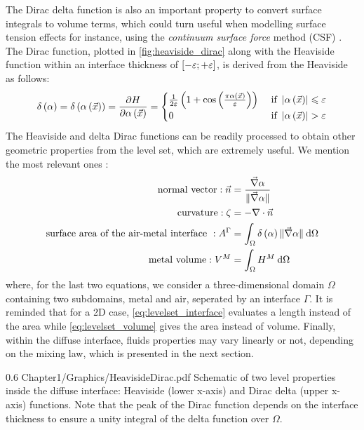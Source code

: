 The Dirac delta function is also an important property to convert surface integrals to volume terms, which could
turn useful when modelling surface tension effects for instance, using 
the \emph{continuum surface force} method (CSF) \citep{brackbill_continuum_1992}.
The Dirac function, plotted in \cref{fig:heaviside_dirac} along with the Heaviside function within an interface thickness 
of $\left[ -\varepsilon;+\varepsilon \right]$, is derived from the Heaviside as follows:
\begin{align}
\label{eq:dirac}
\delta \left( \alpha \right) = \delta \left( \alpha \left( \vec{x} \right) \right) = \frac{\partial H  }{\partial \alpha \left( \vec{x} \right)}=
\begin{cases}
\frac{1}{2\varepsilon} \left(  1 + \cos \left( \frac{\pi \alpha \left( \vec{x} \right)}{\varepsilon } \right)  \right)  & \text{ if } \left | \alpha \left( \vec{x} \right) \right | \leqslant  \varepsilon \\
    0  & \text{ if } \left | \alpha \left( \vec{x} \right) \right | > \varepsilon
\end{cases}
\end{align}
The Heaviside and delta Dirac functions can be readily processed to obtain other geometric properties from the level set,
which are extremely useful. We mention the most relevant ones \citep{peng_pde-based_1999}:
\begin{align}
\label{eq:levelset_normal}
\text{normal vector}: \vec{n} &= \frac{\nabvec \levelset}{\norm{\nabvec \levelset} } \\
%
\label{eq:levelset_curvature}
\text{curvature}: \zeta &= - \nabla \cdot \vec{n} \\
%
\label{eq:levelset_interface}
\text{surface area of the air-metal interface }: A^\Gamma &= \integral{\Omega}{\dirac \norm{\nabvec \levelset}}{\Omega} \\
%
\label{eq:levelset_volume}
\text{metal volume}: V^M &= \integral{\Omega}{\heaviside^M}{\Omega}
%
\end{align}
where, for the last two equations, we consider a three-dimensional domain $\Omega$ 
containing two subdomains, metal and air, seperated by an interface $\Gamma$.
It is reminded that for a 2D case, \cref{eq:levelset_interface} evaluates a length 
instead of the area while \cref{eq:levelset_volume} gives the area instead of volume.
Finally, within the diffuse interface, fluids properties 
may vary linearly or not, depending on the mixing law, which is presented in the next section.
\begin{figureth}
{0.6}
{Chapter1/Graphics/HeavisideDirac.pdf}
{Schematic of two level properties inside the diffuse interface: Heaviside (lower x-axis) and Dirac delta (upper x-axis) functions.
Note that the peak of the Dirac function depends on the interface thickness to ensure a unity integral of the delta function over $\Omega$. }
\label{fig:heaviside_dirac}
\end{figureth}
%

